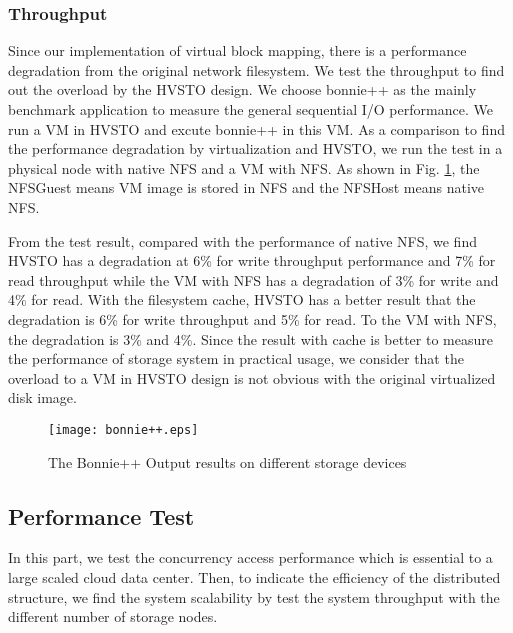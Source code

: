\documentclass[conference]{IEEEtran}
\begin{document}
\subsubsection{Throughput}
Since our implementation of virtual block mapping, there is a performance degradation from the original network filesystem. We test the throughput to find out the overload by the HVSTO design. We choose bonnie++\cite{coker2001bonnie++} as the mainly benchmark application to measure the general sequential I/O performance. We run a VM in HVSTO and excute bonnie++ in this VM. As a comparison to find the performance degradation by virtualization and HVSTO, we run the test in a physical node with native NFS and a VM with NFS. As shown in Fig. \ref{figure:bonnie}, the NFSGuest means VM image is stored in NFS and the NFSHost means native NFS. 

From the test result, compared with the performance of native NFS, we find HVSTO has a degradation at 6\% for write throughput performance and 7\% for read throughput while the VM with NFS has a degradation of 3\% for write and 4\% for read. With the filesystem cache, HVSTO has a better result that the degradation is 6\% for write throughput and 5\% for read. To the VM with NFS, the degradation is 3\% and 4\%. Since the result with cache is better to measure the performance of storage system in practical usage, we consider that the overload to a VM in HVSTO design is not obvious with the original  virtualized disk image. 


\begin{figure}[!ht]
\centering
\texttt{[image: bonnie++.eps]}
\caption{The Bonnie++ Output results on different storage devices}
\label{figure:bonnie}
\end{figure}


\subsection{Performance Test}
In this part, we test the concurrency access performance which is essential to a large scaled cloud data center. Then, to indicate the efficiency of the distributed structure, we find the system scalability by test the system throughput with the different number of storage nodes. 
\end{document}

